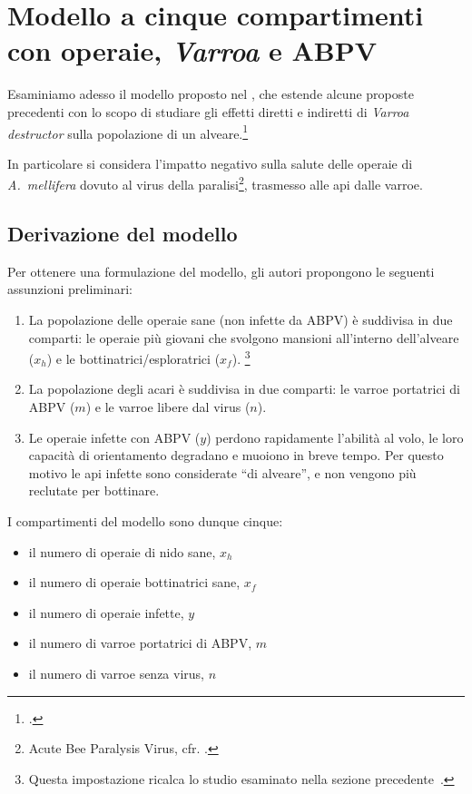 \section{Modello a cinque compartimenti con operaie, \emph{Varroa} e ABPV}
\label{sec:ratti17}
Esaminiamo adesso il modello proposto nel \citeyear{ratti2017}, che estende alcune proposte precedenti con lo scopo di studiare gli effetti diretti e indiretti di \emph{Varroa destructor} sulla popolazione
di un alveare.\footcite{ratti2017}

In particolare si considera l'impatto negativo sulla salute delle operaie di \emph{A.~mellifera} dovuto
al virus della paralisi\footnote{Acute Bee Paralysis Virus, cfr. \cite{abpvAndMore}.}, trasmesso
alle api dalle varroe.

\subsection{Derivazione del modello}
Per ottenere una formulazione del modello, gli autori propongono le seguenti assunzioni preliminari:
\begin{enumerate}
    \item La popolazione delle operaie sane (non infette da ABPV) è suddivisa in due comparti: le operaie più giovani che svolgono mansioni all'interno dell'alveare ($x_h$) e le bottinatrici/esploratrici ($x_f$).
    \footnote{Questa impostazione ricalca lo studio esaminato nella sezione
    precedente~\parencite{khoury2011}.}
    \item La popolazione degli acari è suddivisa in due comparti: le varroe portatrici di ABPV ($m$) e le varroe libere dal virus ($n$).
    \item Le operaie infette con ABPV ($y$) perdono rapidamente l'abilità al volo, le loro capacità di
    orientamento degradano e muoiono in breve tempo. Per questo motivo le api infette sono considerate
    ``di alveare'', e non vengono più reclutate per bottinare.
\end{enumerate}

I compartimenti del modello sono dunque cinque:
\begin{itemize}
    \item il numero di operaie di nido sane, $x_h$
    \item il numero di operaie bottinatrici sane, $x_f$
    \item il numero di operaie infette, $y$
    \item il numero di varroe portatrici di ABPV, $m$
    \item il numero di varroe senza virus, $n$
\end{itemize}

